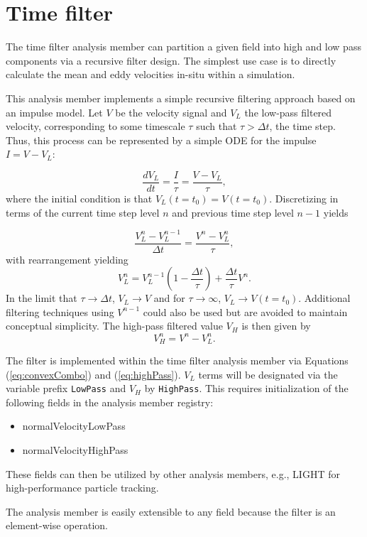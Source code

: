 \section{Time filter}
\label{sec:timeFilter}

The time filter analysis member can partition a given field into high and low pass 
components via a recursive filter design.  The simplest use case is to directly
calculate the mean and eddy velocities in-situ within a simulation.  

This analysis member implements a simple recursive filtering approach based on an impulse model.
Let $V$ be the velocity signal and $V_L$ the low-pass filtered velocity, corresponding to some 
timescale $\tau$ such that $\tau > \Delta t$, the time step.  Thus, this process can be represented by a simple ODE
for the impulse $I = V-V_L$: 

\begin{equation}
  \frac{dV_L}{dt} = \frac{I}{\tau} = \frac{V-V_L}{\tau},
\end{equation}
where the initial condition is that $V_L(t=t_0) = V(t=t_0)$.  
Discretizing in terms of the current time step level $n$ and previous time step level $n-1$ yields

\begin{equation}
  \frac{V_L^n-V_L^{n-1}}{\Delta t} = \frac{V^n -V_L^n}{\tau},
\end{equation}
with rearrangement yielding
\begin{equation}
  V_L^n = V_L^{n-1}\left(1-\frac{\Delta t}{\tau}\right) + \frac{\Delta t}{\tau} V^n.
  \label{eq:convexCombo}
\end{equation}
In the limit that $\tau \rightarrow \Delta t$, $V_L \rightarrow V$ and for 
$\tau \rightarrow \infty$, $V_L \rightarrow V(t=t_0)$.  Additional filtering techniques 
using $V^{n-1}$ could also be used but are avoided to maintain conceptual
simplicity.
The high-pass filtered value $V_H$ is then given by 
\begin{equation}
  V_H^n = V^n - V_L^n.
  \label{eq:highPass}
\end{equation}

The filter is implemented within the time filter analysis member via Equations (\ref{eq:convexCombo}) and (\ref{eq:highPass}).  $V_L$ terms will be designated via the 
variable prefix \verb+LowPass+ and $V_H$ by \verb+HighPass+.  This requires initialization of the following fields in the analysis member registry: 
\begin{itemize}
  \item normalVelocityLowPass 
  \item normalVelocityHighPass 
\end{itemize}
These fields can then be utilized by other analysis members, e.g., LIGHT for high-performance particle tracking.

The analysis member is easily extensible to any field because the filter is an element-wise operation.

